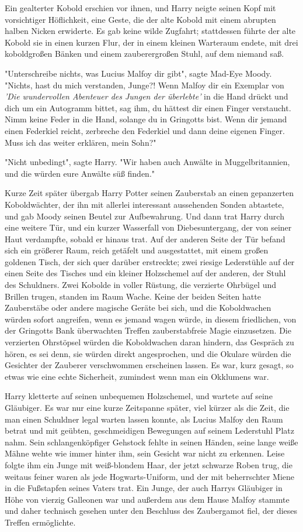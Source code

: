 {Ein gealterter Kobold erschien vor ihnen, und Harry neigte seinen Kopf mit vorsichtiger Höflichkeit, eine Geste, die der alte Kobold mit einem abrupten halben Nicken erwiderte. Es gab keine wilde Zugfahrt; stattdessen führte der alte Kobold sie in einen kurzen Flur, der in einem kleinen Warteraum endete, mit drei koboldgroßen Bänken und einem zauberergroßen Stuhl, auf dem niemand saß.

"Unterschreibe nichts, was Lucius Malfoy dir gibt", sagte Mad-Eye Moody. "Nichts, hast du mich verstanden, Junge?! Wenn Malfoy dir ein Exemplar von \emph{'Die wundervollen Abenteuer des Jungen der überlebte'} in die Hand drückt und dich um ein Autogramm bittet, sag ihm, du hättest dir einen Finger verstaucht. Nimm keine Feder in die Hand, solange du in Gringotts bist. Wenn dir jemand einen Federkiel reicht, zerbreche den Federkiel und dann deine eigenen Finger. Muss ich das weiter erklären, mein Sohn?"

"Nicht unbedingt", sagte Harry. "Wir haben auch Anwälte in Muggelbritannien, und die würden eure Anwälte süß finden."

Kurze Zeit später übergab Harry Potter seinen Zauberstab an einen gepanzerten Koboldwächter, der ihn mit allerlei interessant aussehenden Sonden abtastete, und gab Moody seinen Beutel zur Aufbewahrung. Und dann trat Harry durch eine weitere Tür, und ein kurzer Wasserfall von Diebesuntergang, der von seiner Haut verdampfte, sobald er hinaus trat. Auf der anderen Seite der Tür befand sich ein größerer Raum, reich getäfelt und ausgestattet, mit einem großen goldenen Tisch, der sich quer darüber erstreckte; zwei riesige Lederstühle auf der einen Seite des Tisches und ein kleiner Holzschemel auf der anderen, der Stuhl des Schuldners. Zwei Kobolde in voller Rüstung, die verzierte Ohrbügel und Brillen trugen, standen im Raum Wache. Keine der beiden Seiten hatte Zauberstäbe oder andere magische Geräte bei sich, und die Koboldwachen würden sofort angreifen, wenn es jemand wagen würde, in diesem friedlichen, von der Gringotts Bank überwachten Treffen zauberstabfreie Magie einzusetzen. Die verzierten Ohrstöpsel würden die Koboldwachen daran hindern, das Gespräch zu hören, es sei denn, sie würden direkt angesprochen, und die Okulare würden die Gesichter der Zauberer verschwommen erscheinen lassen. Es war, kurz gesagt, so etwas wie eine echte Sicherheit, zumindest wenn man ein Okklumens war.

Harry kletterte auf seinen unbequemen Holzschemel, und wartete auf seine Gläubiger. Es war nur eine kurze Zeitspanne später, viel kürzer als die Zeit, die man einen Schuldner legal warten lassen konnte, als Lucius Malfoy den Raum betrat und mit geübten, geschmeidigen Bewegungen auf seinem Lederstuhl Platz nahm. Sein schlangenköpfiger Gehstock fehlte in seinen Händen, seine lange weiße Mähne wehte wie immer hinter ihm, sein Gesicht war nicht zu erkennen. Leise folgte ihm ein Junge mit weiß-blondem Haar, der jetzt schwarze Roben trug, die weitaus feiner waren als jede Hogwarts-Uniform, und der mit beherrschter Miene in die Fußstapfen seines Vaters trat. Ein Junge, der auch Harrys Gläubiger in Höhe von vierzig Galleonen war und außerdem aus dem Hause Malfoy stammte und daher technisch gesehen unter den Beschluss des Zaubergamot fiel, der dieses Treffen ermöglichte.

}
